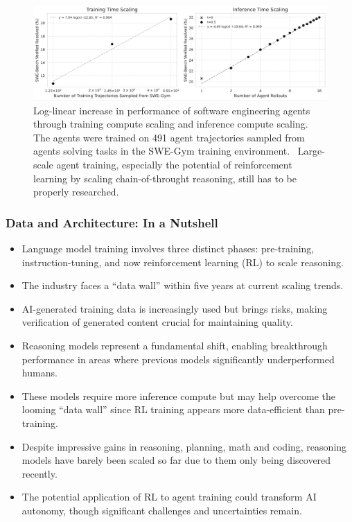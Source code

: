 \documentclass[aspectratio=169]{beamer}
\begin{document}
    \begin{frame}
        \begin{figure}
            \includegraphics[width=1\textwidth]{images/swegym-agent-scaling}
            \caption{Log-linear increase in performance of software engineering agents through training compute scaling and inference compute scaling. The agents were trained on 491 agent trajectories sampled from agents solving tasks in the SWE-Gym training environment.~\parencite{pan2024trainingsoftwareengineeringagents} Large-scale agent training, especially the potential of reinforcement learning by scaling chain-of-throught reasoning, still has to be properly researched.}
        \end{figure}
    \end{frame}
    \begin{frame}
        \frametitle{Data and Architecture: In a Nutshell}
        \begin{itemize}
            \item Language model training involves three distinct phases: pre-training, instruction-tuning, and now reinforcement learning (RL) to scale reasoning.
            \item The industry faces a ``data wall'' within five years at current scaling trends.
            \item AI-generated training data is increasingly used but brings risks, making verification of generated content crucial for maintaining quality.
            \item Reasoning models represent a fundamental shift, enabling breakthrough performance in areas where previous models significantly underperformed humans.
            \item These models require more inference compute but may help overcome the looming ``data wall'' since RL training appears more data-efficient than pre-training.
            \item Despite impressive gains in reasoning, planning, math and coding, reasoning models have barely been scaled so far due to them only being discovered recently.
            \item The potential application of RL to agent training could transform AI autonomy, though significant challenges and uncertainties remain.
        \end{itemize}
    \end{frame}
\end{document}
